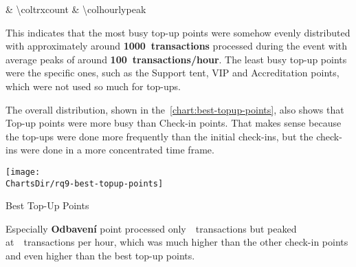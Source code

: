 \begin{table}[htbp]
\begin{tabularx}{\textwidth}
{			& \num[group-separator={,}]{\coltrxcount}
			& \num[group-separator={,}]{\colhourlypeak}
		}
		\noalign{\vspace{1mm}}
		\\
		\noalign{\vspace{1mm}}
		\hline
	\end{tabularx}
	\caption{ Best Top-Up Points}
	\label{tab:best-topup-points}
	\source
\end{table}

This indicates that the most busy top-up points were somehow evenly distributed with approximately around \textbf{1000~transactions} processed during the event with average peaks of around \textbf{100~transactions/hour}.
The least busy top-up points were the specific ones, such as the Support tent, VIP and Accreditation points, which were not used so much for top-ups.

The overall distribution, shown in the~\autoref{chart:best-topup-points}, also shows that Top-up points were more busy than Check-in points.
That makes sense because the top-ups were done more frequently than the initial check-ins, but the check-ins were done in a more concentrated time frame.

\begin{chart}[H]
	\centering
	\texttt{[image: \\ChartsDir/rq9-best-topup-points]}
	\caption{ Best Top-Up Points}
	\label{chart:best-topup-points}
	\source
\end{chart}

Especially \textbf{Odbavení} point processed only~~transactions but peaked at~~transactions per hour, which was much higher than the other check-in points and even higher than the best top-up points.

